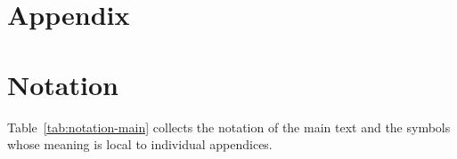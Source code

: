 \section*{Appendix}
\appendix

\setcounter{section}{0}
\setcounter{page}{1}

\renewcommand{\thesection}{\Alph{section}}
\renewcommand{\thesubsection}{\thesection.\arabic{subsection}}
\renewcommand{\thesubsubsection}{\thesubsection.\arabic{subsubsection}}
\renewcommand{\theequation}{\thesection.\arabic{equation}}
\renewcommand{\thefigure}{\thesection.\arabic{figure}}
\renewcommand{\thetable}{\thesection.\arabic{table}}
\makeatletter
{}
\makeatother
\singlespacing

\section{Notation}
\label{app:notation}
Table~\ref{tab:notation-main} collects the notation of the main text and %
the symbols whose meaning is local to individual
appendices. 

